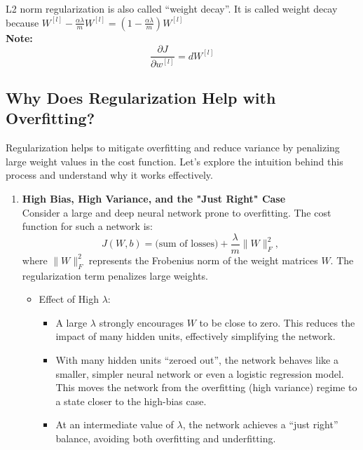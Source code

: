 \documentclass[letterpaper,12pt,notitlepage,twoside]{report}
\begin{document}
L2 norm regularization is also called ``weight decay''. It is called weight decay because \( W^{[l]} - \frac{\alpha \lambda}{m} W^{[l]} = (1 - \frac{\alpha \lambda}{m} ) W^{[l]} \) \\
\textbf{Note:} \\
\[ \frac{\partial J}{\partial w^{[l]}} = dW^{[l]} \]

\subsection{Why Does Regularization Help with Overfitting?}
Regularization helps to mitigate overfitting and reduce variance by penalizing large weight values in the cost function. Let's explore the intuition behind this process and understand why it works effectively.
 \begin{enumerate}
\item \textbf{High Bias, High Variance, and the "Just Right" Case} \\
Consider a large and deep neural network prone to overfitting. The cost function for such a network is:
\[
J(W, b) = \text{(sum of losses)} + \frac{\lambda}{m} \|W\|_F^2,
\]
where \(\|W\|_F^2\) represents the Frobenius norm of the weight matrices \(W\). The regularization term penalizes large weights.
\begin{itemize}
\item Effect of High \(\lambda\):
	\begin{itemize}[leftmargin=*, nosep]
	\item A large \(\lambda\) strongly encourages \(W\) to be close to zero. This reduces the impact of many hidden units, effectively simplifying the network.
	\item With many hidden units ``zeroed out'', the network behaves like a smaller, simpler neural network or even a logistic regression model. This moves the network from the overfitting (high variance) regime to a state closer to the high-bias case.
	\item At an intermediate value of \(\lambda\), the network achieves a ``just right'' balance, avoiding both overfitting and underfitting.
	\end{itemize}


\end{itemize}
\end{enumerate}
\end{document}
